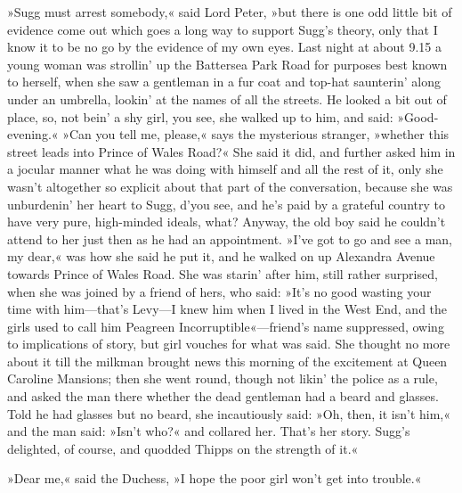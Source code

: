 »Sugg must arrest somebody,« said Lord Peter, »but there is one odd little bit of evidence come out which goes a long way to support Sugg's theory, only that I know it to be no go by the evidence of my own eyes. Last night at about 9.15 a young woman was strollin' up the Battersea Park Road for purposes best known to herself, when she saw a gentleman in a fur coat and top-hat saunterin' along under an umbrella, lookin' at the names of all the streets. He looked a bit out of place, so, not bein' a shy girl, you see, she walked up to him, and said: »Good-evening.« »Can you tell me, please,« says the mysterious stranger, »whether this street leads into Prince of Wales Road?« She said it did, and further asked him in a jocular manner what he was doing with himself and all the rest of it, only she wasn't altogether so explicit about that part of the conversation, because she was unburdenin' her heart to Sugg, d'you see, and he's paid by a grateful country to have very pure, high-minded ideals, what? Anyway, the old boy said he couldn't attend to her just then as he had an appointment. »I've got to go and see a man, my dear,« was how she said he put it, and he walked on up Alexandra Avenue towards Prince of Wales Road. She was starin' after him, still rather surprised, when she was joined by a friend of hers, who said: »It's no good wasting your time with him\allowbreak---\allowbreak that's Levy\allowbreak---\allowbreak I knew him when I lived in the West End, and the girls used to call him Peagreen Incorruptible«---friend's name suppressed, owing to implications of story, but girl vouches for what was said. She thought no more about it till the milkman brought news this morning of the excitement at Queen Caroline Mansions; then she went round, though not likin' the police as a rule, and asked the man there whether the dead gentleman had a beard and glasses. Told he had glasses but no beard, she incautiously said: »Oh, then, it isn't him,« and the man said: »Isn't who?« and collared her. That's her story. Sugg's delighted, of course, and quodded Thipps on the strength of it.«

»Dear me,« said the Duchess, »I hope the poor girl won't get into trouble.«

